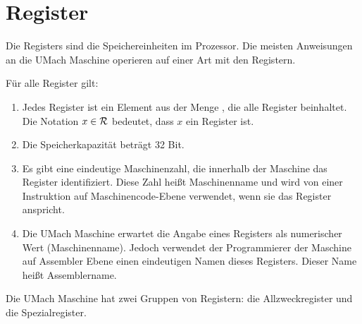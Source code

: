 \section{Register}
\label{sec:Register}

Die \glspl{Register} sind die Speichereinheiten im Prozessor.
Die meisten Anweisungen an die UMach Maschine operieren auf einer Art mit den
Registern.

Für alle Register gilt:
\begin{enumerate}
  \item Jedes Register ist ein Element aus der Menge \Reg, die alle Register
    beinhaltet.\index{\Reg}
    Die Notation $x \in \mathcal{R}$ bedeutet, dass $x$ ein Register ist.
  \item Die Speicherkapazität beträgt 32 Bit.
  \item Es gibt eine eindeutige Maschinenzahl, die innerhalb der
    Maschine das Register identifiziert. Diese Zahl heißt
    \gls{Maschinenname}
    und wird von einer Instruktion auf Maschinencode-Ebene verwendet, wenn sie
    das Register anspricht.
  \item Die UMach Maschine erwartet die Angabe eines Registers als numerischer
    Wert (Maschinenname). Jedoch verwendet der Programmierer der Maschine auf
    Assembler Ebene einen eindeutigen Namen dieses Registers.
    Dieser Name heißt
    \gls{Assemblername}.
\end{enumerate}

Die UMach Maschine hat zwei Gruppen von Registern: die Allzweckregister und
die Spezialregister.





